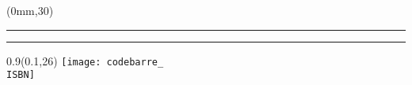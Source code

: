 \begingroup

\textblockorigin{0mm}{0mm}
\setlength{\parindent}{0mm}

\begin{textblock*}{8.5in}(0mm,30\TPVertModule)
  \textcolor{or}{\rule{\TPHorizModule}{\TPVertModule}}     %
  \textcolor{rouge}{\rule{2\TPHorizModule}{\TPVertModule}} %
\end{textblock*}

\begin{textblock*}{0.9\TPHorizModule}(0.1\TPHorizModule,26\TPVertModule)
  \texttt{[image: codebarre\_\\ISBN]}
\end{textblock*}

\endgroup

